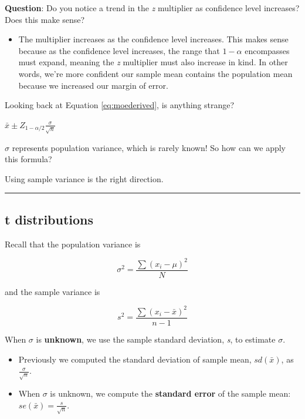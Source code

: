 \documentclass[
  openany]{book}
\providecommand{\tightlist}{%
  \setlength{\itemsep}{0pt}\setlength{\parskip}{0pt}}
\begin{document}
\textbf{Question}: Do you notice a trend in the \emph{z} multiplier as confidence level increases? Does this make sense?

\begin{itemize}
\tightlist
\item
  The multiplier increases as the confidence level increases. This makes sense because as the confidence level increases, the range that \(1-\alpha\) encompasses must expand, meaning the \emph{z} multiplier must also increase in kind. In other words, we're more confident our sample mean contains the population mean because we increased our margin of error.
\end{itemize}

Looking back at Equation \eqref{eq:moederived}, is anything strange?

\(\bar{x}\pm Z_{1-\alpha/2}\frac{\sigma}{\sqrt{n}}\)

\(\sigma\) represents population variance, which is rarely known! So how can we apply this formula?

Using sample variance is the right direction.

\begin{center}\rule{0.5\linewidth}{0.5pt}\end{center}

\subsection{t distributions}\label{t-distributions}

Recall that the population variance is

\begin{equation}
\sigma^2 = \frac{\sum{(x_i-\mu)^2}}{N}
\end{equation}

and the sample variance is

\begin{equation}
s^2 = \frac{\sum{(x_i-\bar{x})^2}}{n-1}
\end{equation}

When \(\sigma\) is \textbf{unknown}, we use the sample standard deviation, \emph{s}, to estimate \(\sigma\).

\begin{itemize}
\tightlist
\item
  Previously we computed the standard deviation of sample mean, \(sd(\bar{x})\), as \(\frac{\sigma}{\sqrt{n}}\).
\item
  When \(\sigma\) is unknown, we compute the \textbf{standard error} of the sample mean: \(se(\bar{x})=\frac{s}{\sqrt{n}}\).
\end{itemize}
\end{document}

